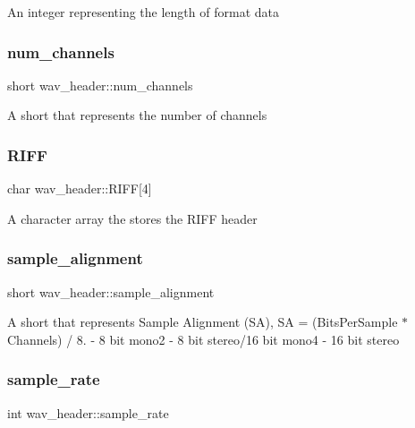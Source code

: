 An integer representing the length of format data \mbox{\label{structwav__header_a625d84de0f598e50c072d725f6e3b6b8}} 
\subsubsection{\texorpdfstring{num\+\_\+channels}{num\_channels}}
{\footnotesize\ttfamily short wav\+\_\+header\+::num\+\_\+channels}

A short that represents the number of channels \mbox{\label{structwav__header_a922454e449922ac5dd868afac8f883da}} 
\subsubsection{\texorpdfstring{R\+I\+FF}{RIFF}}
{\footnotesize\ttfamily char wav\+\_\+header\+::\+R\+I\+FF\mbox{[}4\mbox{]}}

A character array the stores the R\+I\+FF header \mbox{\label{structwav__header_a2672b73c81973008677db6349fbc232a}} 
\subsubsection{\texorpdfstring{sample\+\_\+alignment}{sample\_alignment}}
{\footnotesize\ttfamily short wav\+\_\+header\+::sample\+\_\+alignment}

A short that represents Sample Alignment (SA), SA = (Bits\+Per\+Sample $\ast$ Channels) / 8. -\/ 8 bit mono2 -\/ 8 bit stereo/16 bit mono4 -\/ 16 bit stereo \mbox{\label{structwav__header_a0632019c676aa88f0351c0ab11461de0}} 
\subsubsection{\texorpdfstring{sample\+\_\+rate}{sample\_rate}}
{\footnotesize\ttfamily int wav\+\_\+header\+::sample\+\_\+rate}

